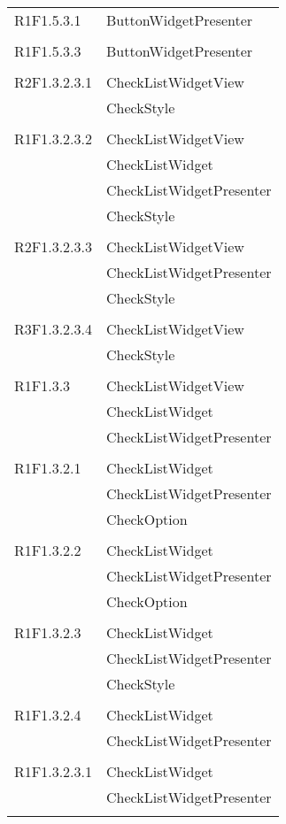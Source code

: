 \begin{center}
\begin{longtable}{|p{7cm}|p{7cm}|}
		R1F1.5.3.1 & ButtonWidgetPresenter \\ & \\ \hline
		R1F1.5.3.3 & ButtonWidgetPresenter \\ & \\ \hline
		R2F1.3.2.3.1 & CheckListWidgetView \\ & CheckStyle \\ & \\ \hline
		R1F1.3.2.3.2 & CheckListWidgetView \\ & CheckListWidget \\ & CheckListWidgetPresenter \\ & CheckStyle \\ & \\ \hline
		R2F1.3.2.3.3 & CheckListWidgetView \\ & CheckListWidgetPresenter \\ & CheckStyle \\ & \\ \hline
		R3F1.3.2.3.4 & CheckListWidgetView \\ & CheckStyle \\ & \\ \hline
		R1F1.3.3 & CheckListWidgetView \\ & CheckListWidget \\ & CheckListWidgetPresenter \\ & \\ \hline
		R1F1.3.2.1 & CheckListWidget \\ & CheckListWidgetPresenter \\ & CheckOption \\ & \\ \hline
		R1F1.3.2.2 & CheckListWidget \\ & CheckListWidgetPresenter \\ & CheckOption \\ & \\ \hline
		R1F1.3.2.3 & CheckListWidget \\ & CheckListWidgetPresenter \\ & CheckStyle \\ & \\ \hline
		R1F1.3.2.4 & CheckListWidget \\ & CheckListWidgetPresenter \\ & \\ \hline
		R1F1.3.2.3.1 & CheckListWidget \\ & CheckListWidgetPresenter \\ & \\ \hline

\end{longtable}
\end{center}
